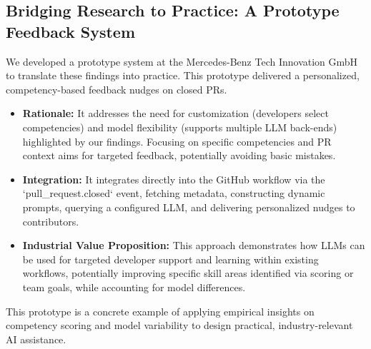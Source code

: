 \documentclass[conference]{IEEEtran}
\begin{document}
\subsection{Bridging Research to Practice: A Prototype Feedback System}
We developed a prototype system at the Mercedes-Benz Tech Innovation GmbH to translate these findings into practice. This prototype delivered a personalized, competency-based feedback nudges on closed PRs.
\begin{itemize}
    \item \textbf{Rationale:} It addresses the need for customization (developers select competencies) and model flexibility (supports multiple LLM back-ends) highlighted by our findings. Focusing on specific competencies and PR context aims for targeted feedback, potentially avoiding basic mistakes.
    \item \textbf{Integration:} It integrates directly into the GitHub workflow via the `pull\_request.closed` event, fetching metadata, constructing dynamic prompts, querying a configured LLM, and delivering personalized nudges to contributors.
    \item \textbf{Industrial Value Proposition:} This approach demonstrates how LLMs can be used for targeted developer support and learning within existing workflows, potentially improving specific skill areas identified via scoring or team goals, while accounting for model differences.
\end{itemize}
This prototype is a concrete example of applying empirical insights on competency scoring and model variability to design practical, industry-relevant AI assistance.
\end{document}
